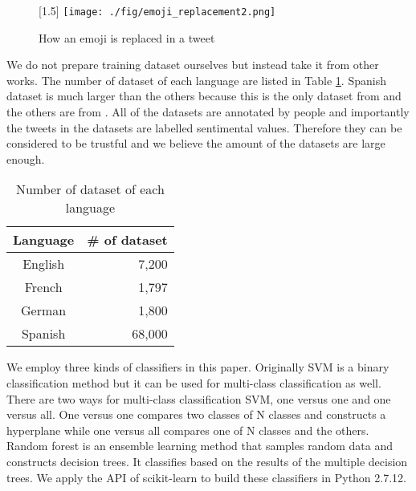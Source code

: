 \documentclass[twocolumn]{article}
\begin{document}
\begin{figure}
	\centering
	\scalebox{1.5}[1.5]{
	\texttt{[image: ./fig/emoji\_replacement2.png]}
	}
	\caption{How an emoji is replaced in a tweet}
	\label{fig:emoji_replacement}
\end{figure}

We do not prepare training dataset ourselves but instead take it from other works.
The number of dataset of each language are listed in Table \ref{tab:dataset}.
Spanish dataset is much larger than the others because this is the only dataset from \cite{dataset_spanish} and the others are from \cite{dataset}.
All of the datasets are annotated by people and importantly the tweets in the datasets are labelled sentimental values.
Therefore they can be considered to be trustful and we believe the amount of the datasets are large enough.

\begin{table}[ht]
	\caption{Number of dataset of each language}
	\centering
	\begin{tabular}{|c|r|} \hline
	Language & \# of dataset \\ \hline \hline
	English & 7,200  \\ \hline
	French & 1,797  \\ \hline
	German & 1,800  \\ \hline
	Spanish & 68,000  \\ \hline
	\end{tabular}
	\label{tab:dataset}
\end{table}

We employ three kinds of classifiers in this paper.
Originally SVM is a binary classification method but it can be used for multi-class classification as well.
There are two ways for multi-class classification SVM, one versus one and one versus all.
One versus one compares two classes of N classes and constructs a hyperplane while one versus all compares one of N classes and the others.
Random forest is an ensemble learning method that samples random data and constructs decision trees.
It classifies based on the results of the multiple decision trees. 
We apply the API of scikit-learn \cite{scikit} to build these classifiers in Python 2.7.12.
\end{document}

